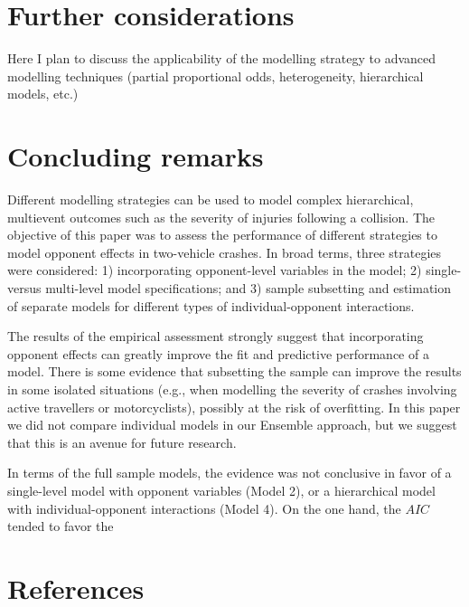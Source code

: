 \documentclass[]{elsarticle} %
\begin{document}
\hypertarget{sec:further-considerations}{%
\section{Further considerations}\label{sec:further-considerations}}

Here I plan to discuss the applicability of the modelling strategy to
advanced modelling techniques (partial proportional odds, heterogeneity,
hierarchical models, etc.)

\hypertarget{sec:concluding-remarks}{%
\section{Concluding remarks}\label{sec:concluding-remarks}}

Different modelling strategies can be used to model complex
hierarchical, multievent outcomes such as the severity of injuries
following a collision. The objective of this paper was to assess the
performance of different strategies to model opponent effects in
two-vehicle crashes. In broad terms, three strategies were considered:
1) incorporating opponent-level variables in the model; 2) single-
versus multi-level model specifications; and 3) sample subsetting and
estimation of separate models for different types of individual-opponent
interactions.

The results of the empirical assessment strongly suggest that
incorporating opponent effects can greatly improve the fit and
predictive performance of a model. There is some evidence that
subsetting the sample can improve the results in some isolated
situations (e.g., when modelling the severity of crashes involving
active travellers or motorcyclists), possibly at the risk of
overfitting. In this paper we did not compare individual models in our
Ensemble approach, but we suggest that this is an avenue for future
research.

In terms of the full sample models, the evidence was not conclusive in
favor of a single-level model with opponent variables (Model 2), or a
hierarchical model with individual-opponent interactions (Model 4). On
the one hand, the \(AIC\) tended to favor the

\hypertarget{references}{%
\section*{References}\label{references}}
\end{document}
